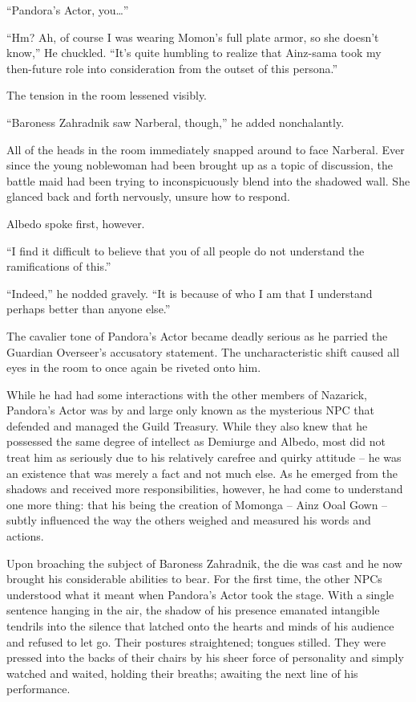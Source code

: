  

“Pandora’s Actor, you…”

 

“Hm? Ah, of course I was wearing Momon’s full plate armor, so she doesn’t know,” He chuckled. “It’s quite humbling to realize that Ainz-sama took my then-future role into consideration from the outset of this persona.”

 

The tension in the room lessened visibly.

 

“Baroness Zahradnik saw Narberal, though,” he added nonchalantly.

 

All of the heads in the room immediately snapped around to face Narberal. Ever since the young noblewoman had been brought up as a topic of discussion, the battle maid had been trying to inconspicuously blend into the shadowed wall. She glanced back and forth nervously, unsure how to respond.

 

Albedo spoke first, however.

 

“I find it difficult to believe that you of all people do not understand the ramifications of this.”

 

“Indeed,” he nodded gravely. “It is because of who I am that I understand perhaps better than anyone else.”

 

The cavalier tone of Pandora’s Actor became deadly serious as he parried the Guardian Overseer’s accusatory statement. The uncharacteristic shift caused all eyes in the room to once again be riveted onto him.

 

While he had had some interactions with the other members of Nazarick, Pandora’s Actor was by and large only known as the mysterious NPC that defended and managed the Guild Treasury. While they also knew that he possessed the same degree of intellect as Demiurge and Albedo, most did not treat him as seriously due to his relatively carefree and quirky attitude – he was an existence that was merely a fact and not much else. As he emerged from the shadows and received more responsibilities, however, he had come to understand one more thing: that his being the creation of Momonga – Ainz Ooal Gown – subtly influenced the way the others weighed and measured his words and actions.

 

Upon broaching the subject of Baroness Zahradnik, the die was cast and he now brought his considerable abilities to bear. For the first time, the other NPCs understood what it meant when Pandora’s Actor took the stage. With a single sentence hanging in the air, the shadow of his presence emanated intangible tendrils into the silence that latched onto the hearts and minds of his audience and refused to let go. Their postures straightened; tongues stilled. They were pressed into the backs of their chairs by his sheer force of personality and simply watched and waited, holding their breaths; awaiting the next line of his performance.